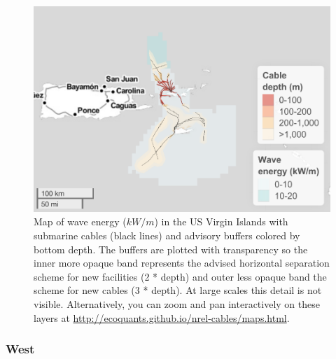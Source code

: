 \documentclass[]{article}
\begin{document}
\begin{figure}
\centering
\includegraphics{report_files/figure-latex/mapWaveUSVirginIslands-1.pdf}
\caption{\label{fig:mapWaveUSVirginIslands}Map of wave energy (\(kW/m\)) in
the US Virgin Islands with submarine cables (black lines) and advisory
buffers colored by bottom depth. The buffers are plotted with
transparency so the inner more opaque band represents the advised
horizontal separation scheme for new facilities (2 * depth) and outer
less opaque band the scheme for new cables (3 * depth). At large scales
this detail is not visible. Alternatively, you can zoom and pan
interactively on these layers at
\url{http://ecoquants.github.io/nrel-cables/maps.html}.}
\end{figure}

\hypertarget{west-1}{%
\subsubsection{West}\label{west-1}}
\end{document}
